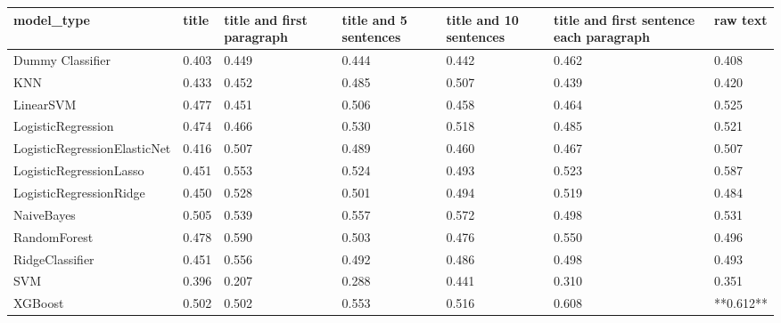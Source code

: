 \begin{tabular}{lllllll}
\toprule
                  model\_type & title & title and first paragraph & title and 5 sentences & title and 10 sentences & title and first sentence each paragraph &  raw text \\
\midrule
            Dummy Classifier & 0.403 &                     0.449 &                 0.444 &                  0.442 &                                   0.462 &     0.408 \\
                         KNN & 0.433 &                     0.452 &                 0.485 &                  0.507 &                                   0.439 &     0.420 \\
                   LinearSVM & 0.477 &                     0.451 &                 0.506 &                  0.458 &                                   0.464 &     0.525 \\
          LogisticRegression & 0.474 &                     0.466 &                 0.530 &                  0.518 &                                   0.485 &     0.521 \\
LogisticRegressionElasticNet & 0.416 &                     0.507 &                 0.489 &                  0.460 &                                   0.467 &     0.507 \\
     LogisticRegressionLasso & 0.451 &                     0.553 &                 0.524 &                  0.493 &                                   0.523 &     0.587 \\
     LogisticRegressionRidge & 0.450 &                     0.528 &                 0.501 &                  0.494 &                                   0.519 &     0.484 \\
                  NaiveBayes & 0.505 &                     0.539 &                 0.557 &                  0.572 &                                   0.498 &     0.531 \\
                RandomForest & 0.478 &                     0.590 &                 0.503 &                  0.476 &                                   0.550 &     0.496 \\
             RidgeClassifier & 0.451 &                     0.556 &                 0.492 &                  0.486 &                                   0.498 &     0.493 \\
                         SVM & 0.396 &                     0.207 &                 0.288 &                  0.441 &                                   0.310 &     0.351 \\
                     XGBoost & 0.502 &                     0.502 &                 0.553 &                  0.516 &                                   0.608 & **0.612** \\
\bottomrule
\end{tabular}
